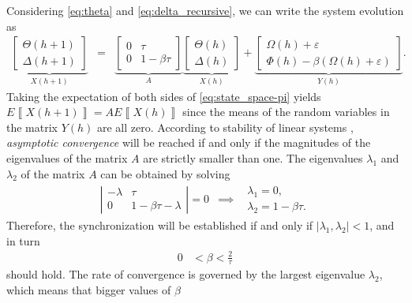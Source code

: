 \documentclass[journal,draftcls,onecolumn,12pt,twoside]{IEEEtranTCOM}
\newcommand{\expected}[1]{E\left\llbracket #1 \right\rrbracket}
\begin{document}
Considering \eqref{eq:theta} and \eqref{eq:delta_recursive}, we can write the 
system evolution as
\begin{eqnarray}
\underset{X(h+1)}{
	\underbrace{
		\left[\begin{array}{c}
		\Theta(h+1)\\
		\Delta(h+1)
		\end{array}\right]
	}
} & = & 
\underset{A}{
	\underbrace{
		\left[\begin{array}{cc}
		0 & \tau\\
		0 & 1-\beta\tau
		\end{array}\right]
	}
}
\underset{X(h)}{
	\underbrace{
		\left[\begin{array}{c}
		\Theta(h)\\
		\Delta(h)
		\end{array}\right]}
}
+
\underset{Y(h)}{
	\underbrace{
		\left[\begin{array}{c}
		\Omega(h)+\varepsilon\\
		\Phi(h)-\beta(\Omega(h)+\varepsilon)
		\end{array}\right]}
}.\label{eq:state_space-pi}
\end{eqnarray}
Taking the expectation of both sides of \eqref{eq:state_space-pi} yields 
$\expected{X(h+1)} = A\expected{X(h)}$ since 
the means of the random variables in the matrix $Y(h)$ are all zero. According 
to stability of linear systems \cite{book-luenberger}, \emph{asymptotic 
	convergence} will be reached if and only if the magnitudes of the 
eigenvalues of the matrix $A$ are strictly smaller than one. The eigenvalues 
$\lambda_1$ and $\lambda_2$ of the matrix $A$ can be obtained 
by solving
\begin{eqnarray}
\left|\begin{array}{cc}
-\lambda & \tau\\
0 & 1-\beta\tau-\lambda
\end{array}\right|=0 &\implies& 
\begin{array}{c}
\lambda_1 = 0,\\
\lambda_2 = 1-\beta\tau.  
\end{array}\label{eq:eigens}
\end{eqnarray}
Therefore, the synchronization will be  established if 
and only if $|\lambda_1,\lambda_2|<1$, and in turn
\begin{align}
0 & <\beta<\frac{2}{\tau}\label{eq:step_size_bounds-pi}
\end{align}
should hold. The 
rate of convergence is governed by 
the largest eigenvalue $\lambda_2$, which means that bigger values of $\beta$ 
\end{document}
